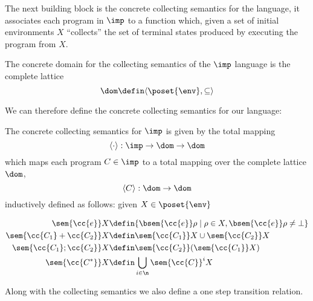 The next building block is the concrete collecting semantics for the
language, it associates each program in \(\imp\) to a function which,
given a set of initial environments \(X\) ``collects'' the set of
terminal states produced by executing the program from \(X\).

\begin{definition}
  The concrete domain for the collecting semantics of the \(\imp\)
  language is the complete lattice \[\dom \defin \langle \poset{\env}
  , \subseteq \rangle \]
\end{definition}

We can therefore define the concrete collecting semantics for our
language:

\begin{definition}
  The concrete collecting semantics for \(\imp\) is given by the total
  mapping \[\langle \cdot \rangle : \imp \to \dom \to \dom\] which
  maps each program \(C \in \imp\) to a total mapping over the
  complete lattice \(\dom\), \[\langle C \rangle : \dom \to \dom\]
  inductively defined as follows: given \(X \in \poset{\env}\)

  \begin{align*}
    \sem{\cc{e}} X & \defin \{\bsem{\cc{e}} \rho \mid \rho \in X,
    \bsem{\cc{e}} \rho \neq \bot\} \\
    \sem{\cc{C_1} + \cc{C_2}} X & \defin \sem{\cc{C_1}} X \cup \sem{\cc{C_2}} X \\
    \sem{\cc{C_1} ; \cc{C_2}} X & \defin \sem{\cc{C_2}}(\sem{\cc{C_1}} X) \\
    \sem{\cc{C^*}} X & \defin \bigcup_{i \in \n} \sem{\cc{C}}^i X
  \end{align*}
\end{definition}


Along with the collecting semantics we also define a one step
transition relation.

